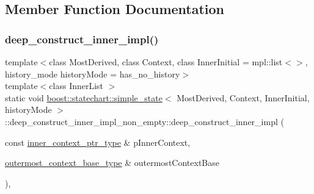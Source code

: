 \subsection{Member Function Documentation}
\mbox{\label{structboost_1_1statechart_1_1simple__state_1_1deep__construct__inner__impl__non__empty_a5e9e6ad9f24ac1eea0c3b2dc8d12cad0}} 
\subsubsection{\texorpdfstring{deep\+\_\+construct\+\_\+inner\+\_\+impl()}{deep\_construct\_inner\_impl()}}
{\footnotesize\ttfamily template$<$class Most\+Derived, class Context, class Inner\+Initial = mpl\+::list$<$$>$, history\+\_\+mode history\+Mode = has\+\_\+no\+\_\+history$>$ \\
template$<$class Inner\+List $>$ \\
static void \mbox{\hyperlink{classboost_1_1statechart_1_1simple__state}{boost\+::statechart\+::simple\+\_\+state}}$<$ Most\+Derived, Context, Inner\+Initial, history\+Mode $>$\+::deep\+\_\+construct\+\_\+inner\+\_\+impl\+\_\+non\+\_\+empty\+::deep\+\_\+construct\+\_\+inner\+\_\+impl (\begin{DoxyParamCaption}\item[{const \mbox{\hyperlink{classboost_1_1statechart_1_1simple__state_ad6d3233a11a23e91b4cc9edcae799379}{inner\+\_\+context\+\_\+ptr\+\_\+type}} \&}]{p\+Inner\+Context,  }\item[{\mbox{\hyperlink{classboost_1_1statechart_1_1simple__state_a50f21d7a7d6632eb34430e74cbad3197}{outermost\+\_\+context\+\_\+base\+\_\+type}} \&}]{outermost\+Context\+Base }\end{DoxyParamCaption})\hspace{0.3cm}{\ttfamily [inline]}, {\ttfamily [static]}}

